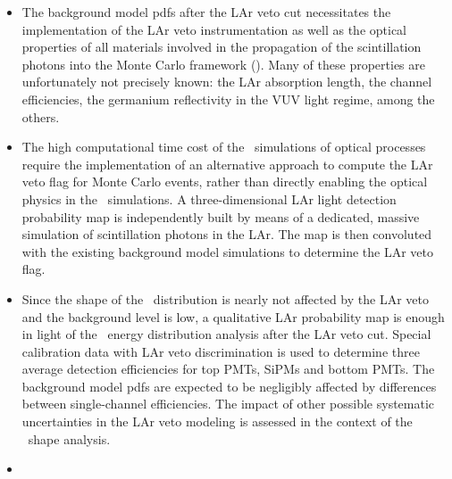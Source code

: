\chapsummary
\begin{itemize}
  \item The background model pdfs after the LAr veto cut necessitates the implementation
    of the LAr veto instrumentation as well as the optical properties of all materials
    involved in the propagation of the scintillation photons into the Monte Carlo
    framework (\mage). Many of these properties are unfortunately not precisely known: the
    LAr absorption length, the channel efficiencies, the germanium reflectivity in the VUV
    light regime, among the others.
  \item The high computational time cost of the \geant\ simulations of optical processes
    require the implementation of an alternative approach to compute the LAr veto flag for
    Monte Carlo events, rather than directly enabling the optical physics in the \mage\
    simulations. A three-dimensional LAr light detection probability map is independently
    built by means of a dedicated, massive simulation of scintillation photons in the LAr.
    The map is then convoluted with the existing background model simulations to determine
    the LAr veto flag.
  \item Since the shape of the \nnbb\ distribution is nearly not affected by the LAr veto
    and the background level is low, a qualitative LAr probability map is enough in light
    of the \nnbb\ energy distribution analysis after the LAr veto cut. Special calibration
    data with LAr veto discrimination is used to determine three average detection
    efficiencies for top PMTs, SiPMs and bottom PMTs. The background model pdfs are
    expected to be negligibly affected by differences between single-channel efficiencies.
    The impact of other possible systematic uncertainties in the LAr veto modeling is
    assessed in the context of the \nnbb\ shape analysis.
  \item {}
\end{itemize}


